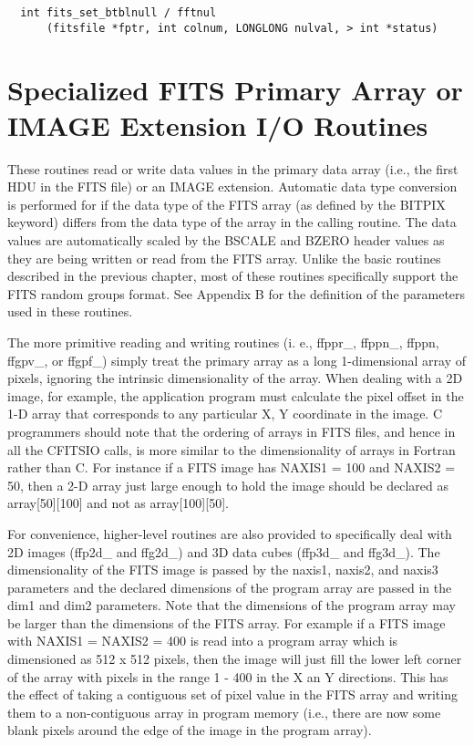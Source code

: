 \documentclass[11pt]{book}
\begin{document}
\begin{verbatim}
  int fits_set_btblnull / fftnul
      (fitsfile *fptr, int colnum, LONGLONG nulval, > int *status)
\end{verbatim}


\section{Specialized FITS Primary Array or IMAGE Extension I/O Routines}

These routines read or write data values in the primary data array
(i.e., the first HDU in the FITS file) or an IMAGE extension.
Automatic data type conversion is performed for if the data type of the
FITS array (as defined by the BITPIX keyword) differs from the data
type of the array in the calling routine.  The data values are
automatically scaled by the BSCALE and BZERO header values as they are
being written or read from the FITS array.  Unlike the basic routines
described in the previous chapter, most of these routines specifically
support the FITS random groups format.  See Appendix B for the
definition of the parameters used in these routines.

The more primitive reading and writing routines (i. e., ffppr\_,
ffppn\_, ffppn, ffgpv\_, or ffgpf\_) simply treat the primary array as
a long 1-dimensional array of pixels, ignoring the intrinsic
dimensionality of the array.  When dealing with a 2D image, for
example, the application program must calculate the pixel offset in the
1-D array that corresponds to any particular X, Y coordinate in the
image.  C programmers should note that the ordering of arrays in FITS
files, and hence in all the CFITSIO calls, is more similar to the
dimensionality of arrays in Fortran rather than C.  For instance if a
FITS image has NAXIS1 = 100 and NAXIS2 = 50, then a 2-D array just
large enough to hold the image should be declared as array[50][100] and
not as array[100][50].

For convenience, higher-level routines are also provided to specifically
deal with 2D images (ffp2d\_ and ffg2d\_) and 3D data cubes (ffp3d\_
and ffg3d\_).  The dimensionality of the FITS image is passed by the
naxis1, naxis2, and naxis3 parameters and the declared dimensions of
the program array are passed in the dim1 and dim2 parameters.  Note
that the dimensions of the program array may be larger than the
dimensions of the FITS array.  For example if a FITS image with NAXIS1
= NAXIS2 = 400 is read into a program array which is dimensioned as 512
x 512 pixels, then the image will just fill the lower left corner of
the array with pixels in the range 1 - 400 in the X an Y directions.
This has the effect of taking a contiguous set of pixel value in the
FITS array and writing them to a non-contiguous array in program memory
(i.e., there are now some blank pixels around the edge of the image in
the program array).
\end{document}
